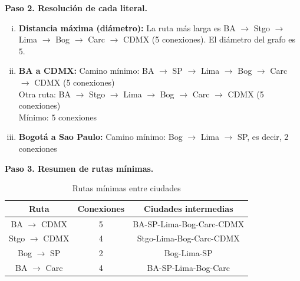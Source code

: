 \begin{prob}
\begin{myproof}
\textbf{Paso 2. Resolución de cada literal.}
\begin{enumerate}[i.]
\item \textbf{Distancia máxima (diámetro):}
La ruta más larga es BA $\to$ Stgo $\to$ Lima $\to$ Bog $\to$ Carc $\to$ CDMX (5 conexiones).
El diámetro del grafo es $\boxed{5}$.

\item \textbf{BA a CDMX:}
Camino mínimo: BA $\to$ SP $\to$ Lima $\to$ Bog $\to$ Carc $\to$ CDMX (5 conexiones) \\
Otra ruta: BA $\to$ Stgo $\to$ Lima $\to$ Bog $\to$ Carc $\to$ CDMX (5 conexiones) \\
Mínimo: $\boxed{5}$ conexiones

\item \textbf{Bogotá a Sao Paulo:}
Camino mínimo: Bog $\to$ Lima $\to$ SP, es decir, $\boxed{2}$ conexiones
\end{enumerate}

\textbf{Paso 3. Resumen de rutas mínimas.}
\begin{table}[H]
\centering
\begin{tabular}{c|c|c}
\textbf{Ruta} & \textbf{Conexiones} & \textbf{Ciudades intermedias} \\
\hline
BA $\to$ CDMX & 5 & BA-SP-Lima-Bog-Carc-CDMX \\
Stgo $\to$ CDMX & 4 & Stgo-Lima-Bog-Carc-CDMX \\
Bog $\to$ SP & 2 & Bog-Lima-SP \\
BA $\to$ Carc & 4 & BA-SP-Lima-Bog-Carc \\
\end{tabular}
\caption{Rutas mínimas entre ciudades}
\end{table}
\end{myproof}
\end{prob}

